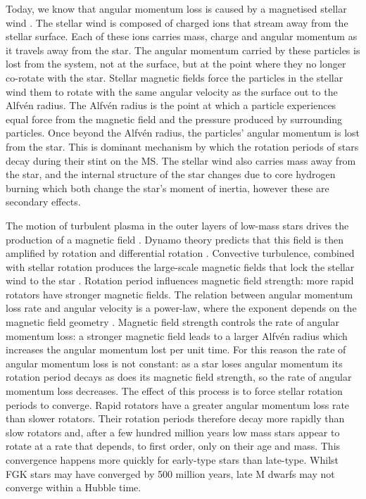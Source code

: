 Today, we know that angular momentum loss is caused by a magnetised stellar
wind \citep{Schatzman1962, Weber1967, Mestel1984}.
The stellar wind is composed of charged ions that stream away from the stellar
surface.
Each of these ions carries mass, charge and angular momentum as it travels
away from the star.
The angular momentum carried by these particles is lost from the system, not
at the surface, but at the point where they no longer co-rotate with the star.
Stellar magnetic fields force the particles in the stellar wind them to rotate
with the same angular velocity as the surface out to the Alfv{\'e}n radius.
The Alfv{\'e}n radius is the point at which a particle experiences equal force
from the magnetic field and the pressure produced by surrounding particles.
Once beyond the Alfv{\'e}n radius, the particles' angular momentum is lost
from the star.
This is dominant mechanism by which the rotation periods of stars decay during
their stint on the MS.
The stellar wind also carries mass away from the star, and the internal
structure of the star changes due to core hydrogen burning which both change
the star's moment of inertia, however these are secondary effects.

The motion of turbulent plasma in the outer layers of low-mass stars drives
the production of a magnetic field \citep[][]{Schatzman1962}.
Dynamo theory predicts that this field is then amplified by rotation and
differential rotation \citep[\eg][]{Parker1970}.
Convective turbulence, combined with stellar rotation produces the large-scale
magnetic fields that lock the stellar wind to the star
\citep[\eg][]{Charbonneau2010}.
Rotation period influences magnetic field strength: more rapid rotators have
stronger magnetic fields.
The relation between angular momentum loss rate and angular velocity is a
power-law, where the exponent depends on the magnetic field geometry
\citet{Mestel1984, Kawaler1988}.
Magnetic field strength controls the rate of angular momentum loss: a stronger
magnetic field leads to a larger Alfv{\'e}n radius which increases the angular
momentum lost per unit time.
For this reason the rate of angular momentum loss is not constant: as a star
loses angular momentum its rotation period decays as does its magnetic field
strength, so the rate of angular momentum loss decreases.
The effect of this process is to force stellar rotation periods to converge.
Rapid rotators have a greater angular momentum loss rate than slower rotators.
Their rotation periods therefore decay more rapidly than slow rotators and,
after a few hundred million years low mass stars appear to rotate at a rate
that depends, to first order, only on their age and mass.
This convergence happens more quickly for early-type stars than late-type.
Whilst FGK stars may have converged by 500 million years, \citep{Radick1987,
Irwin2009} late M dwarfs may not converge within a Hubble time.


